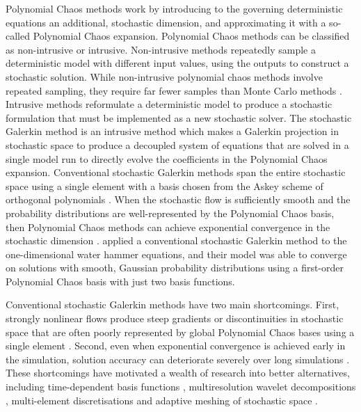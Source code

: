 Polynomial Chaos methods work by introducing to the governing deterministic equations an additional, stochastic dimension, and approximating it with a so-called Polynomial Chaos expansion.
Polynomial Chaos methods can be classified as non-intrusive or intrusive.
Non-intrusive methods repeatedly sample a deterministic model with different input values, using the outputs to construct a stochastic solution.
While non-intrusive polynomial chaos methods involve repeated sampling, they require far fewer samples than Monte Carlo methods \citep{ge2008,ge2011}.
Intrusive methods reformulate a deterministic model to produce a stochastic formulation that must be implemented as a new stochastic solver.
The stochastic Galerkin method is an intrusive method which makes a Galerkin projection in stochastic space to produce a decoupled system of equations that are solved in a single model run to directly evolve the coefficients in the Polynomial Chaos expansion.
Conventional stochastic Galerkin methods span the entire stochastic space using a single element with a basis chosen from the Askey scheme of orthogonal polynomials \citep{xiu-karniadakis2002}.
When the stochastic flow is sufficiently smooth and the probability distributions are well-represented by the Polynomial Chaos basis, then Polynomial Chaos methods can achieve exponential convergence in the stochastic dimension \citep{xiu-karniadakis2003}.
\citet{sattar-elbeltagy2017} applied a conventional stochastic Galerkin method to the one-dimensional water hammer equations, and their model was able to converge on solutions with smooth, Gaussian probability distributions using a first-order Polynomial Chaos basis with just two basis functions.

Conventional stochastic Galerkin methods have two main shortcomings.
First, strongly nonlinear flows produce steep gradients or discontinuities in stochastic space that are often poorly represented by global Polynomial Chaos bases using a single element \citep{pettersson2014}.
Second, even when exponential convergence is achieved early in the simulation, solution accuracy can deteriorate severely over long simulations \citep{gerritsma2010}.
These shortcomings have motivated a wealth of research into better alternatives, including time-dependent basis functions \citep{gerritsma2010}, multiresolution wavelet decompositions \citep{lemaitre2004a}, multi-element discretisations and adaptive meshing of stochastic space \citep{wan-karniadakis2006,tryoen2010a,pettersson2014,li-stinis2015}.

